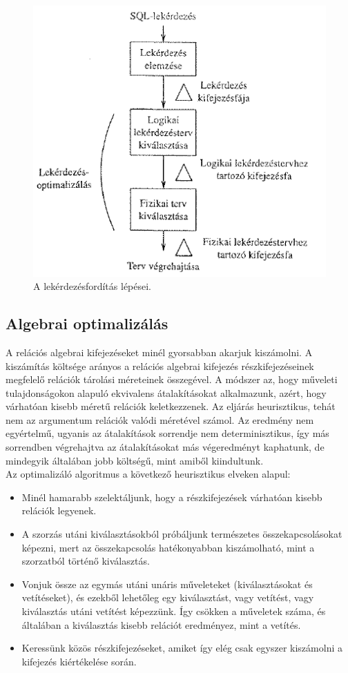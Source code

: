 \documentclass[margin=0px]{article}
\begin{document}
\begin{figure}[H]
    \centering
    \includegraphics[width=0.5\linewidth]{img/querycompiling}
    \caption{A lekérdezésfordítás lépései.}
    \label{fig:querycompiling}
\end{figure}

\subsection{Algebrai optimalizálás}

A relációs algebrai kifejezéseket minél gyorsabban akarjuk kiszámolni. A kiszámítás költsége arányos a relációs algebrai kifejezés részkifejezéseinek megfelelő relációk tárolási méreteinek összegével. A módszer az, hogy műveleti tulajdonságokon alapuló ekvivalens átalakításokat alkalmazunk, azért, hogy várhatóan kisebb méretű relációk keletkezzenek. Az eljárás heurisztikus, tehát nem az argumentum relációk valódi méretével számol. Az eredmény nem egyértelmű, ugyanis az átalakítások sorrendje nem determinisztikus, így más sorrendben végrehajtva az átalakításokat más végeredményt kaphatunk, de mindegyik általában jobb költségű, mint amiből kiindultunk.\\

\noindent Az optimalizáló algoritmus a következő heurisztikus elveken alapul:
\begin{itemize}
    \item	Minél hamarabb szelektáljunk, hogy a részkifejezések várhatóan kisebb relációk legyenek.
    \item	A szorzás utáni kiválasztásokból próbáljunk természetes összekapcsolásokat képezni, mert az összekapcsolás hatékonyabban kiszámolható, mint a szorzatból történő kiválasztás.
    \item	Vonjuk össze az egymás utáni unáris műveleteket (kiválasztásokat és vetítéseket), és ezekből lehetőleg egy kiválasztást, vagy vetítést, vagy kiválasztás utáni vetítést képezzünk. Így csökken a műveletek száma, és általában a kiválasztás kisebb relációt eredményez, mint a vetítés.
    \item	Keressünk közös részkifejezéseket, amiket így elég csak egyszer kiszámolni a kifejezés kiértékelése során.
\end{itemize}
\end{document}
